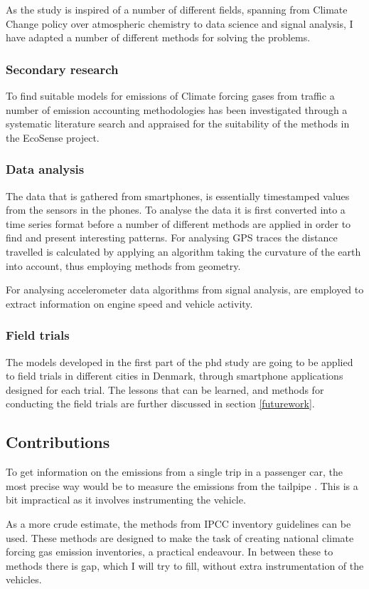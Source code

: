 As the study is inspired of a number of different fields, spanning from Climate Change policy over atmospheric chemistry to data science and signal analysis, I have adapted a number of different methods for solving the problems. 

\subsubsection{Secondary research}
To find suitable models for emissions of Climate forcing gases from traffic a number of emission accounting methodologies has been investigated through a systematic literature search and appraised for the suitability of the methods in the EcoSense project.

\subsubsection{Data analysis}
The data that is gathered from smartphones, is essentially timestamped values from the sensors in the phones. To analyse the data it is first converted into a time series format before a number of different methods are applied in order to find and present interesting patterns. For analysing GPS traces the distance travelled is calculated by applying an algorithm taking the curvature of the earth into account, thus employing methods from geometry.

For analysing accelerometer data algorithms from signal analysis, are employed to extract  information on engine speed and vehicle activity.
\subsubsection{Field trials}
The models developed in the first part of the phd study are going to be applied to field trials in different cities in Denmark, through smartphone applications designed for each trial. The lessons that can be learned, and methods for conducting the field trials are further discussed in section \ref{futurework}.
\subsection{Contributions}
To get information on the emissions from a single trip in a passenger car, the most precise way would be to measure the emissions from the tailpipe \cite{Frey}. This is a bit impractical as it involves instrumenting the vehicle.

As a more crude estimate, the methods from IPCC inventory guidelines can be used. These methods are designed to make the task of creating national climate forcing gas emission inventories, a practical endeavour. In between these to methods there is gap, which I will try to fill, without extra instrumentation of the vehicles.

